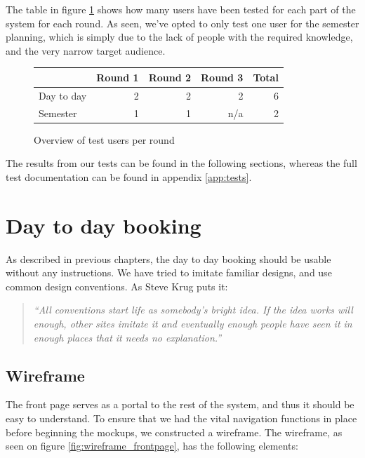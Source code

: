 The table in figure \ref{fig:usa_users} shows how many users have been tested for each part of the system for each round. As seen, we've opted to only test one user for the semester planning, which is simply due to the lack of people with the required knowledge, and the very narrow target audience.

\begin{figure}[htb]
\begin{center}
\leavevmode
	\begin{tabular}{|l|r|r|r||r|}
		\hline
		 & Round 1 & Round 2 & Round 3 & Total \\ \hline
		Day to day & 2 & 2 & 2 & 6\\ \hline
		Semester & 1 & 1 & n/a & 2 \\ \hline
	\end{tabular}
\end{center}
\caption{Overview of test users per round}
\label{fig:usa_users}
\end{figure}


The results from our tests can be found in the following sections, whereas the full test documentation can be found in appendix \ref{app:tests}.

\section{Day to day booking}
\label{sec:day_to_day_booking_ui}
As described in previous chapters, the day to day booking should be usable without any instructions. We have tried to imitate familiar designs, and use common design conventions. As Steve Krug puts it\cite{steve}: 
\begin{quotation}
\emph{``All conventions start life as somebody's bright idea. If the idea works will enough, other sites imitate it and eventually enough people have seen it in enough places that it needs no explanation.''}
\end{quotation}

\subsection{Wireframe}
\label{subsec:wireframe}
The front page serves as a portal to the rest of the system, and thus it should be easy to understand. To ensure that we had the vital navigation functions in place before beginning the mockups, we constructed a wireframe\cite{garrett}. The wireframe, as seen on figure \ref{fig:wireframe_frontpage}, has the following elements:

